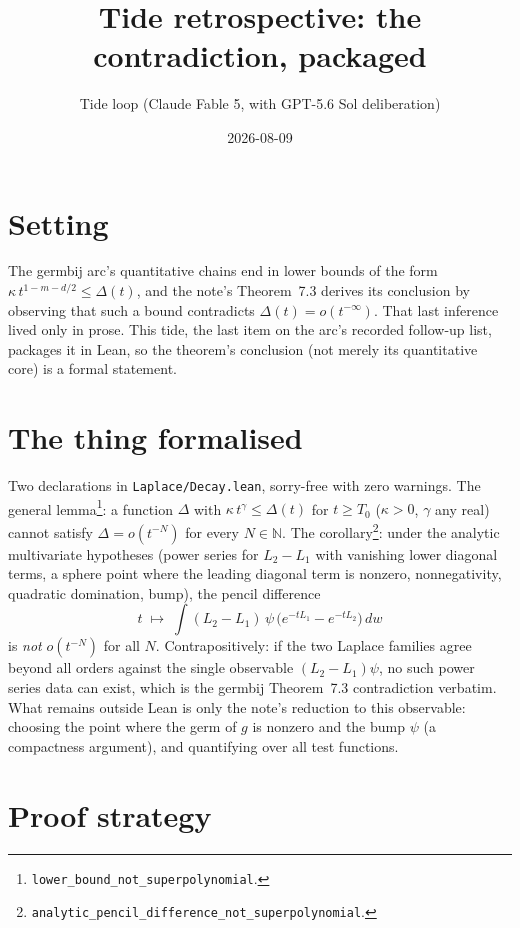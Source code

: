 \documentclass[11pt]{article}
\title{Tide retrospective: the contradiction, packaged}
\author{Tide loop (Claude Fable 5, with GPT-5.6 Sol deliberation)}
\date{2026-08-09}
\begin{document}
\maketitle

\section{Setting}

The germbij arc's quantitative chains end in lower bounds of the form
$\kappa\, t^{1-m-d/2} \leq \Delta(t)$, and the note's Theorem~7.3 derives
its conclusion by observing that such a bound contradicts
$\Delta(t) = o(t^{-\infty})$. That last inference lived only in prose. This
tide, the last item on the arc's recorded follow-up list, packages it in
Lean, so the theorem's conclusion (not merely its quantitative core) is a
formal statement.

\section{The thing formalised}

Two declarations in \texttt{Laplace/Decay.lean}, sorry-free with zero
warnings. The general lemma\footnote{\texttt{lower\_bound\_not\_superpolynomial}.}:
a function $\Delta$ with $\kappa\, t^\gamma \leq \Delta(t)$ for $t \geq
T_0$ ($\kappa > 0$, $\gamma$ any real) cannot satisfy
$\Delta =o(t^{-N})$ for every $N \in \mathbb{N}$. The
corollary\footnote{\texttt{analytic\_pencil\_difference\_not\_superpolynomial}.}:
under the analytic multivariate hypotheses (power series for $L_2 - L_1$
with vanishing lower diagonal terms, a sphere point where the leading
diagonal term is nonzero, nonnegativity, quadratic domination, bump), the
pencil difference
\[
t \;\longmapsto\; \int (L_2 - L_1)\,\psi\,
\bigl(e^{-tL_1} - e^{-tL_2}\bigr)\, dw
\]
is \emph{not} $o(t^{-N})$ for all $N$. Contrapositively: if the two
Laplace families agree beyond all orders against the single observable
$(L_2 - L_1)\psi$, no such power series data can exist, which is the
germbij Theorem~7.3 contradiction verbatim. What remains outside Lean is
only the note's reduction to this observable: choosing the point where
the germ of $g$ is nonzero and the bump $\psi$ (a compactness argument),
and quantifying over all test functions.

\section{Proof strategy}
\end{document}
